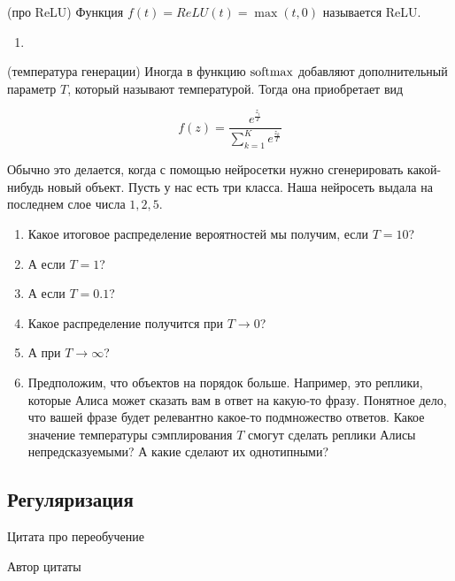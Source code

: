 \begin{problem}{(про ReLU)}
	Функция $f(t) = ReLU(t) = \max(t, 0)$ называется ReLU.
	\begin{enumerate}
        \item 
	\end{enumerate}
\end{problem} 





\begin{problem}{(температура генерации)}
	Иногда в функцию $\operatorname{softmax}$ добавляют дополнительный параметр $T$, который называют температурой. Тогда она приобретает вид 
	
	$$ 
	f(z) =  \frac{e^{\tfrac{z_i}{T}}}{ \sum_{k=1}^K e^{\tfrac{z_k}{T}}}
	$$

	Обычно это делается, когда с помощью нейросетки нужно сгенерировать какой-нибудь новый объект.  Пусть у нас есть три класса. Наша нейросеть выдала на последнем слое числа $1,2,5$. 

	\begin{enumerate}
		\item  Какое итоговое распределение вероятностей мы получим, если $T = 10$? 
		\item  А если $T = 1$? 
		\item  А если $T = 0.1$? 
		\item  Какое распределение получится при $T \to 0$? 
		\item  А при $T \to \infty$? 
		\item  Предположим, что объектов на порядок больше. Например, это реплики, которые Алиса может сказать вам в ответ на какую-то фразу.  Понятное дело, что вашей фразе будет релевантно какое-то подмножество ответов. Какое значение температуры сэмплирования $T$ смогут сделать реплики Алисы непредсказуемыми? А какие сделают их однотипными? 
	\end{enumerate}
\end{problem}


\subsection{Регуляризация}

\epigraph{Цитата про переобучение}{Автор цитаты}


